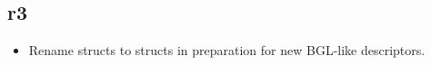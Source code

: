 \subsection*{\paperno r3}

\begin{itemize}
      \item Rename  structs to  structs in preparation for new BGL-like descriptors.
\end{itemize}
